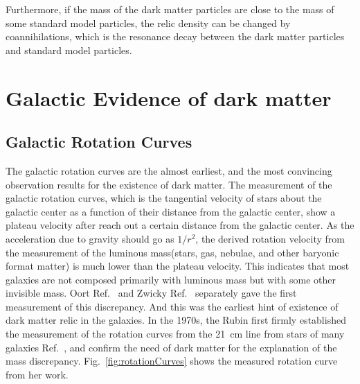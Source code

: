 Furthermore, if the mass of the dark matter particles are close to the mass of some standard model particles, the relic density can be changed by coannihilations, which is the resonance decay between the dark matter particles and standard model particles.

\section{Galactic Evidence of dark matter}
\subsection{Galactic Rotation Curves}
The galactic rotation curves are the almost earliest, and the most convincing observation results for the existence of dark matter. The measurement of the galactic rotation curves, which is the tangential velocity of stars about the galactic center as a function of their distance from the galactic center, show a plateau velocity after reach out a certain distance from the galactic center. As the acceleration due to gravity should go as $1/r^2$, the derived rotation velocity from the measurement of the luminous mass(stars, gas, nebulae, and other baryonic format matter) is much lower than the plateau velocity. This indicates that most galaxies are not composed primarily with luminous mass but with some other invisible mass. Oort Ref.~\cite{Oort1932} and Zwicky Ref.~\cite{Zwicky1933} separately gave the first measurement of this discrepancy. And this was the earliest hint of existence of dark matter relic in the galaxies. In the 1970s, the Rubin first firmly established the measurement of the rotation curves from the \SI{21}{\cm} line from stars of many galaxies Ref.~\cite{Rubin1983}, and confirm the need of dark matter for the explanation of the mass discrepancy. Fig.~\ref{fig:rotationCurves} shows the measured rotation curve from her work. 
 
